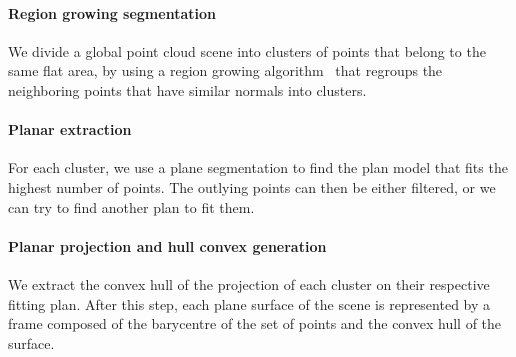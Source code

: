 \paragraph{Region growing segmentation}
We divide a global point cloud scene into clusters of points that belong to the same flat area, by using a region growing algorithm~\cite{poppinga:iros:2008} that regroups the neighboring points that have similar normals into clusters.

\paragraph{Planar extraction}
For each cluster, we use a plane segmentation to find the plan model that fits the highest number of points.
The outlying points can then be either filtered, or we can try to find another plan to fit them.

\paragraph{Planar projection and hull convex generation}
We extract the convex hull of the projection of each cluster on their respective fitting plan.
After this step, each plane surface of the scene is represented by a frame composed of the barycentre of the set of points and the convex hull of the surface.

